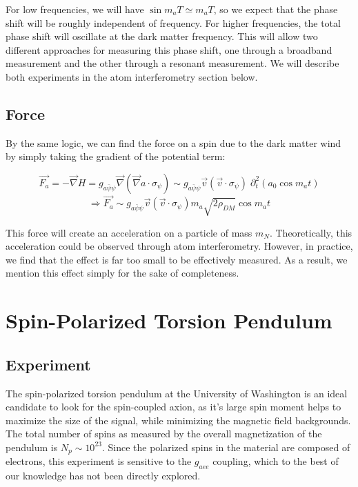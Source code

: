 \documentclass[aps,prd,final,letterpaper]{revtex4}
\newcommand{\coupling}{g_{a\bar{\psi}\psi}}
\begin{document}
For low frequencies, we will have $\sin{m_a T} \simeq m_a T$, so we expect that the phase shift will be roughly independent of frequency. For higher frequencies, the total phase shift will oscillate at the dark matter frequency. This will allow two different approaches for measuring this phase shift, one through a broadband measurement and the other through a resonant measurement. We will describe both experiments in the atom interferometry section below.

\subsection{Force}

By the same logic, we can find the force on a spin due to the dark matter wind by simply taking the gradient of the potential term:

\begin{equation}
\vec{F_a} = -\vec{\nabla}H = \coupling\vec{\nabla}\left(\vec{\nabla}a \cdot \sigma_{\psi}\right) \sim \coupling\vec{v}\left(\vec{v}\cdot \sigma_{\psi}\right)\; \partial^2_t \left(a_0 \cos{m_a t}\right) 
\end{equation}
\begin{equation}
\Rightarrow \vec{F_a} \sim \coupling \vec{v}\left(\vec{v}\cdot\sigma_{\psi}\right)m_a\sqrt{2\rho_{DM}}\cos{m_a t}
\end{equation}

This force will create an acceleration on a particle of mass $m_{N}$. Theoretically, this acceleration could be observed through atom interferometry. However, in practice, we find that the effect is far too small to be effectively measured. As a result, we mention this effect simply for the sake of completeness.

\section{Spin-Polarized Torsion Pendulum}

\subsection{Experiment}

The spin-polarized torsion pendulum at the University of Washington is an ideal candidate to look for the spin-coupled axion, as it's large spin moment helps to maximize the size of the signal, while minimizing the magnetic field backgrounds. The total number of spins as measured by the overall magnetization of the pendulum is $N_p \sim 10^{23}$. Since the polarized spins in the material are composed of electrons, this experiment is sensitive to the $g_{aee}$ coupling, which to the best of our knowledge has not been directly explored. 
\end{document}
